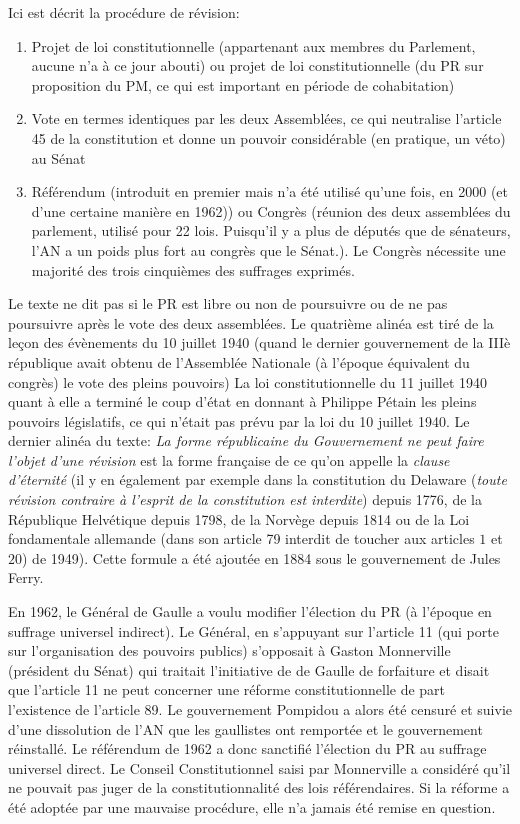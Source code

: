 \documentclass[math]{cours}
\begin{document}
Ici est décrit la procédure de révision:
\begin{enumerate}
	\item Projet de loi constitutionnelle (appartenant aux membres du Parlement, aucune n'a à ce jour abouti) ou projet de loi constitutionnelle (du PR sur proposition du PM, ce qui est important en période de cohabitation)
	\item Vote en termes identiques par les deux Assemblées, ce qui neutralise l'article 45 de la constitution et donne un pouvoir considérable (en pratique, un véto) au Sénat
	\item Référendum (introduit en premier mais n'a été utilisé qu'une fois, en 2000 (et d'une certaine manière en 1962)) ou Congrès (réunion des deux assemblées du parlement, utilisé pour 22 lois. Puisqu'il y a plus de députés que de sénateurs, l'AN a un poids plus fort au congrès que le Sénat.).
		Le Congrès nécessite une majorité des trois cinquièmes des suffrages exprimés.
\end{enumerate}
Le texte ne dit pas si le PR est libre ou non de poursuivre ou de ne pas poursuivre après le vote des deux assemblées.
Le quatrième alinéa est tiré de la leçon des évènements du 10 juillet 1940 (quand le dernier gouvernement de la IIIè république avait obtenu de l'Assemblée Nationale (à l'époque équivalent du congrès) le vote des pleins pouvoirs)
La loi constitutionnelle du 11 juillet 1940 quant à elle a terminé le coup d'état en donnant à Philippe Pétain les pleins pouvoirs législatifs, ce qui n'était pas prévu par la loi du 10 juillet 1940.
Le dernier alinéa du texte: \emph{La forme républicaine du Gouvernement ne peut faire l'objet d'une révision} est la forme française de ce qu'on appelle la \emph{clause d'éternité} (il y en également par exemple dans la constitution du Delaware (\emph{toute révision contraire à l'esprit de la constitution est interdite}) depuis 1776, de la République Helvétique depuis 1798, de la Norvège depuis 1814 ou de la Loi fondamentale allemande (dans son article 79 interdit de toucher aux articles $1$ et $20$) de 1949).
Cette formule a été ajoutée en 1884 sous le gouvernement de Jules Ferry.

En 1962, le Général de Gaulle a voulu modifier l'élection du PR (à l'époque en suffrage universel indirect).
Le Général, en s'appuyant sur l'article 11 (qui porte sur l'organisation des pouvoirs publics) s'opposait à
Gaston Monnerville (président du Sénat) qui traitait l'initiative de de Gaulle de forfaiture
et disait que l'article 11 ne peut concerner une réforme constitutionnelle de part l'existence de l'article 89.
Le gouvernement Pompidou a alors été censuré et suivie d'une dissolution de l'AN que les gaullistes ont remportée et le gouvernement réinstallé.
Le référendum de 1962 a donc sanctifié l'élection du PR au suffrage universel direct.
Le Conseil Constitutionnel saisi par Monnerville a considéré qu'il ne pouvait pas juger de la constitutionnalité des lois référendaires.
Si la réforme a été adoptée par une mauvaise procédure, elle n'a jamais été remise en question.
\end{document}
